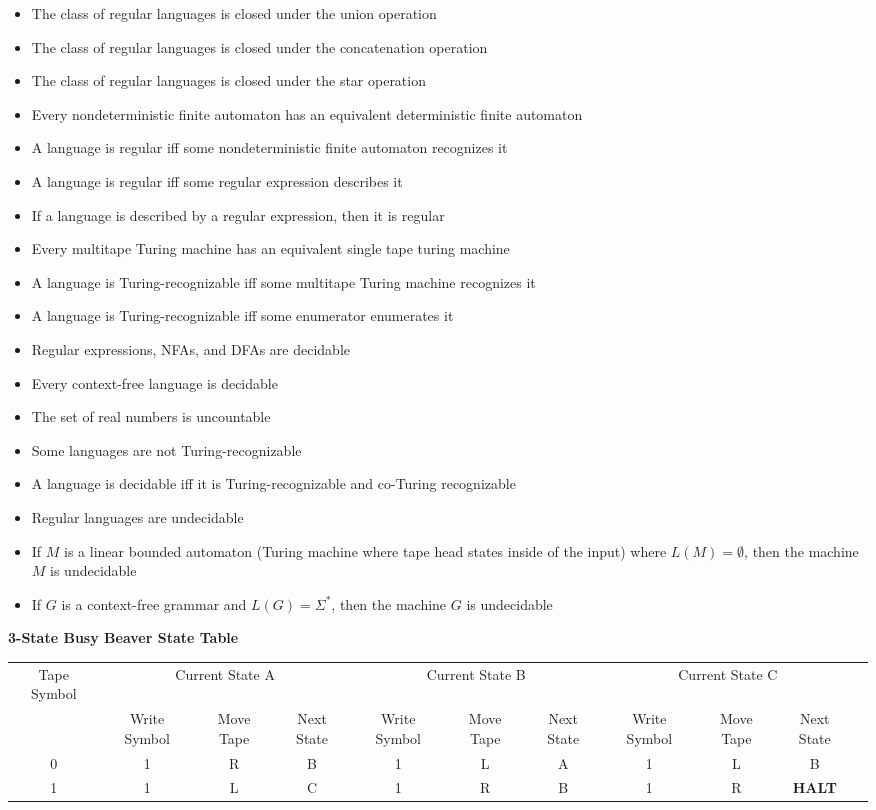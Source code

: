 \documentclass[8pt,landscape,legalpaper]{article}
\begin{document}
\begin{multicols}{6}
\begin{itemize}
    \item The class of regular languages is closed under the union operation
    \item The class of regular languages is closed under the concatenation operation
    \item The class of regular languages is closed under the star operation
    \item Every nondeterministic finite automaton has an equivalent deterministic finite automaton
    \item A language is regular iff some nondeterministic finite automaton recognizes it
    \item A language is regular iff some regular expression describes it
    \item If a language is described by a regular expression, then it is regular
    \item Every multitape Turing machine has an equivalent single tape turing machine
    \item A language is Turing-recognizable iff some multitape Turing machine recognizes it
    \item A language is Turing-recognizable iff some enumerator enumerates it
    \item Regular expressions, NFAs, and DFAs are decidable
    \item Every context-free language is decidable
    \item The set of real numbers is uncountable
    \item Some languages are not Turing-recognizable
    \item A language is decidable iff it is Turing-recognizable and co-Turing recognizable
    \item Regular languages are undecidable
    \item If $M$ is a linear bounded automaton (Turing machine where tape head states inside of the input) where $L(M) = \emptyset$, then the machine $M$ is undecidable
    \item If $G$ is a context-free grammar and $L(G) = \Sigma^*$, then the machine $G$ is undecidable
\end{itemize}

\end{multicols}

\pagebreak

{\bf 3-State Busy Beaver State Table}

\begin{tabular}{|c|c|c|c|c|c|c|c|c|c|c|}
    \hline
    Tape Symbol & \multicolumn{3}{|c|}{Current State A} & \multicolumn{3}{|c|}{Current State B} & \multicolumn{3}{|c|}{Current State C} \\
    & Write Symbol & Move Tape & Next State & Write Symbol & Move Tape & Next State & Write Symbol & Move Tape & Next State\\
    \hline
    0 & 1 & R & B & 1 & L & A & 1 & L & B\\
    1 & 1 & L & C & 1 & R & B & 1 & R & {\bf HALT}\\
    \hline
\end{tabular}
\end{document}
